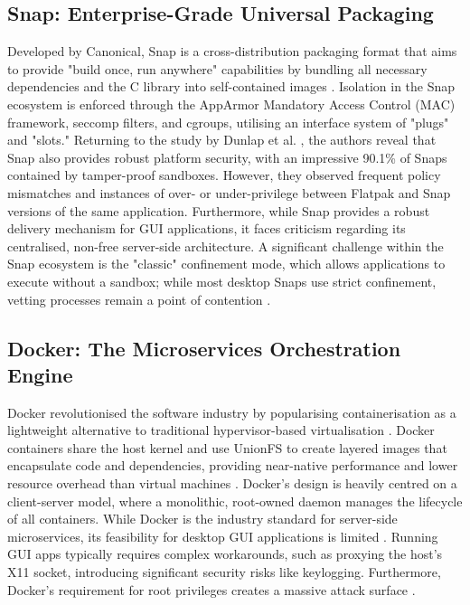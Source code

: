 \documentclass[journal,onecolumn]{IEEEtran}
\begin{document}
\subsection{Snap: Enterprise-Grade Universal Packaging}
Developed by Canonical, Snap is a cross-distribution packaging format that aims to provide "build once, run anywhere" capabilities by bundling all necessary dependencies and the C library into self-contained images \cite{Singh2025}. Isolation in the Snap ecosystem is enforced through the AppArmor Mandatory Access Control (MAC) framework, seccomp filters, and cgroups, utilising an interface system of "plugs" and "slots." Returning to the study by Dunlap et al. \cite{10.1145/3532105.3535016}, the authors reveal that Snap also provides robust platform security, with an impressive 90.1\% of Snaps contained by tamper-proof sandboxes. However, they observed frequent policy mismatches and instances of over- or under-privilege between Flatpak and Snap versions of the same application. Furthermore, while Snap provides a robust delivery mechanism for GUI applications, it faces criticism regarding its centralised, non-free server-side architecture. A significant challenge within the Snap ecosystem is the "classic" confinement mode, which allows applications to execute without a sandbox; while most desktop Snaps use strict confinement, vetting processes remain a point of contention \cite{Singh2025}.

\subsection{Docker: The Microservices Orchestration Engine}
Docker revolutionised the software industry by popularising containerisation as a lightweight alternative to traditional hypervisor-based virtualisation \cite{Busaleh2025}. Docker containers share the host kernel and use UnionFS to create layered images that encapsulate code and dependencies, providing near-native performance and lower resource overhead than virtual machines \cite{Dua2014, li2022serverless}. Docker's design is heavily centred on a client-server model, where a monolithic, root-owned daemon manages the lifecycle of all containers. While Docker is the industry standard for server-side microservices, its feasibility for desktop GUI applications is limited \cite{li2022serverless}. Running GUI apps typically requires complex workarounds, such as proxying the host's X11 socket, introducing significant security risks like keylogging. Furthermore, Docker's requirement for root privileges creates a massive attack surface \cite{BenKebaier2024}. 
\end{document}
